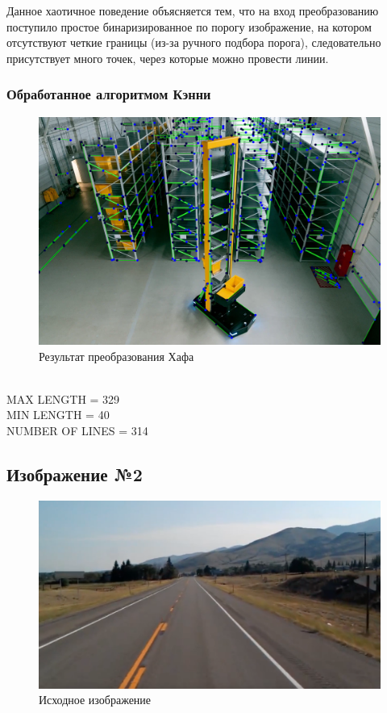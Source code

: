Данное хаотичное поведение объясняется тем, что на вход преобразованию поступило простое бинаризированное по порогу изображение,
 на котором отсутствуют четкие границы (из-за ручного подбора порога), следовательно присутствует много точек, через которые можно провести линии. 

\subsubsection{Обработанное алгоритмом Кэнни}

\begin{figure}[H]
    \includegraphics[width=\textwidth]{../outputs/image1_canny.png}
    \caption{Результат преобразования Хафа}
    \label{fig:image1_canny}
\end{figure}
\ \\
MAX LENGTH = 329 \\
MIN LENGTH = 40 \ \\
NUMBER OF LINES = 314


\subsection{Изображение №2}

\begin{figure}[H]
    \includegraphics[width=\textwidth]{../source/2.png}
    \caption{Исходное изображение}
    \label{fig:source_image}
\end{figure}

